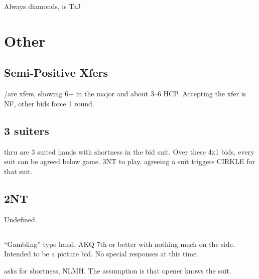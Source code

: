 \documentclass[tom-ari]{subfile}
\begin{document}
	Always diamonds,  is TaJ

	\section{Other}
	
	\subsection{Semi-Positive Xfers}
	
	/\hhh are xfers, showing 6+ in the major and about 3--6 HCP.  Accepting the xfer is NF, other bids force 1 round.
	
	\subsection{3 suiters}
	
	 thru  are 3 suited hands with shortness in the bid suit. Over these 4x1 bids, every suit can be agreed below game. 3NT to play, agreeing a suit triggers CIRKLE for that suit.
	
	\subsection{2NT}
	
	Undefined.
	
	\subsection[3S]{}
	
	``Gambling'' type hand, AKQ 7th or better with nothing much on the side. Intended to be a picture bid. No special responses at this time. 

	
	 asks for shortness, NLMH.  The assumption is that opener knows the suit. 
\end{document}
